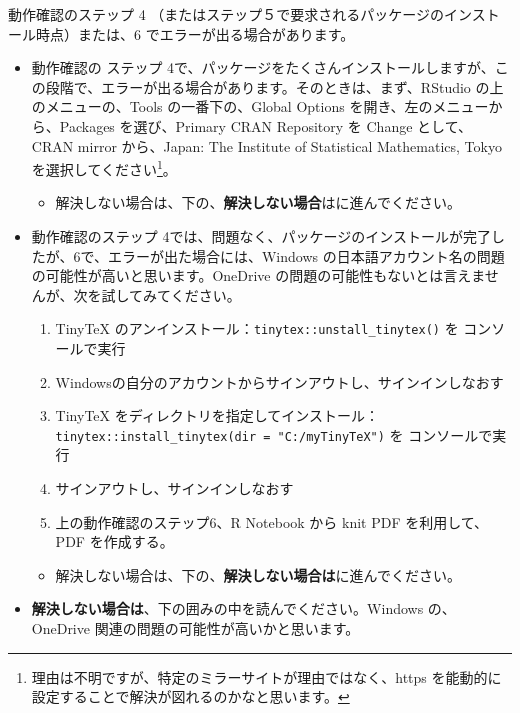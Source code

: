 \documentclass[
  xelatex, ja=standard]{bxjsbook}
\providecommand{\tightlist}{%
  \setlength{\itemsep}{0pt}\setlength{\parskip}{0pt}}
\theoremstyle{definition}
\theoremstyle{definition}
\theoremstyle{definition}
\theoremstyle{definition}
\theoremstyle{remark}
\begin{document}
動作確認のステップ 4 （またはステップ５で要求されるパッケージのインストール時点）または、6 でエラーが出る場合があります。

\begin{itemize}
\item
  動作確認の ステップ 4で、パッケージをたくさんインストールしますが、この段階で、エラーが出る場合があります。そのときは、まず、RStudio の上のメニューの、Tools の一番下の、Global Options を開き、左のメニューから、Packages を選び、Primary CRAN Repository を Change として、CRAN mirror から、Japan: The Institute of Statistical Mathematics, Tokyo を選択してください\footnote{理由は不明ですが、特定のミラーサイトが理由ではなく、https を能動的に設定することで解決が図れるのかなと思います。}。

  \begin{itemize}
  \tightlist
  \item
    解決しない場合は、下の、\textbf{解決しない場合}はに進んでください。
  \end{itemize}
\item
  動作確認のステップ 4では、問題なく、パッケージのインストールが完了したが、6で、エラーが出た場合には、Windows の日本語アカウント名の問題の可能性が高いと思います。OneDrive の問題の可能性もないとは言えませんが、次を試してみてください。

  \begin{enumerate}
  \def\labelenumi{\arabic{enumi}.}
  \tightlist
  \item
    TinyTeX のアンインストール：\texttt{tinytex::unstall\_tinytex()} を コンソールで実行
  \item
    Windowsの自分のアカウントからサインアウトし、サインインしなおす
  \item
    TinyTeX をディレクトリを指定してインストール：\texttt{tinytex::install\_tinytex(dir\ =\ "C:/myTinyTeX")} を コンソールで実行
  \item
    サインアウトし、サインインしなおす
  \item
    上の動作確認のステップ6、R Notebook から knit PDF を利用して、PDF を作成する。
  \end{enumerate}

  \begin{itemize}
  \tightlist
  \item
    解決しない場合は、下の、\textbf{解決しない場合は}に進んでください。
  \end{itemize}
\item
  \textbf{解決しない場合は}、下の囲みの中を読んでください。Windows の、OneDrive 関連の問題の可能性が高いかと思います。


\end{itemize}
\end{document}

